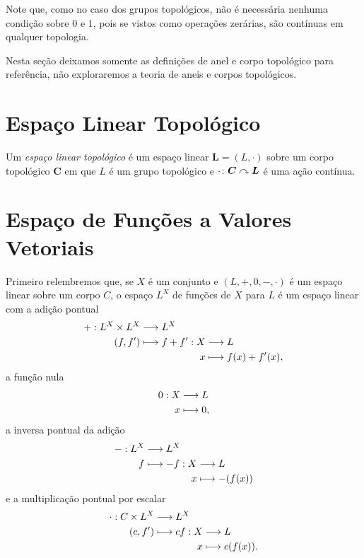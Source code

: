 Note que, como no caso dos grupos topológicos, não é necessária nenhuma condição sobre $0$ e $1$, pois se vistos como operações zerárias, são contínuas em qualquer topologia.

Nesta seção deixamos somente as definições de anel e corpo topológico para referência, não exploraremos a teoria de aneis e corpos topológicos.

\section{Espaço Linear Topológico}

\begin{defi}
Um \emph{espaço linear topológico} é um espaço linear $\bm L = (L,\cdot)$ sobre um corpo topológico $\bm C$ em que $L$ é um grupo topológico e $\cdot\colon \bm C \curvearrowright \bm L$ é uma ação contínua.
\end{defi}

\section{Espaço de Funções a Valores Vetoriais}

Primeiro relembremos que, se $X$ é um conjunto e $(L,+,0,-,\cdot)$ é um espaço linear sobre um corpo $C$, o espaço $L^X$ de funções de $X$ para $L$ é um espaço linear com a adição pontual
	\begin{align*}
	{+}: {L^X \times L^X} &\longrightarrow {L^X} \\{(f,f')} &\longmapsto {
		\begin{aligned}[t]
		 {f+f'}: {X} &\longrightarrow{L} \\{x} &\longmapsto{f(x)+f'(x),} 
		\end{aligned}	
	}
	\end{align*}
a função nula
	\begin{align*}
	\func{0}{X}{L}{x}{0,}
	\end{align*}
a inversa pontual da adição
	\begin{align*}
	{-}: {L^X} &\longrightarrow {L^X} \\{f} &\longmapsto {
		\begin{aligned}[t]
		 {-f}: {X} &\longrightarrow{L} \\{x} &\longmapsto{-(f(x))} 
		\end{aligned}
	}
	\end{align*}
e a multiplicação pontual por escalar
	\begin{align*}
	{\cdot}: {C \times L^X} &\longrightarrow {L^X} \\{(c,f')} &\longmapsto {
		\begin{aligned}[t]
		 {cf}: {X} &\longrightarrow{L} \\{x} &\longmapsto{c(f(x)).} 
		\end{aligned}	
	}
	\end{align*}

